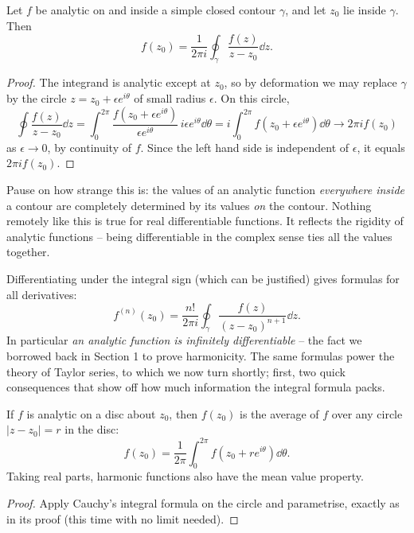 \documentclass[a4paper]{scrartcl}
\begin{document}
\begin{theorem}
	Let $f$ be analytic on and inside a simple closed contour $\gamma$, and let $z_0$ lie inside $\gamma$. Then
	$$
	f(z_0) = \frac{1}{2\pi i} \oint_\gamma \frac{f(z)}{z - z_0} \dd z.
	$$
\end{theorem}
\begin{proof}
	The integrand is analytic except at $z_0$, so by deformation we may replace $\gamma$ by the circle $z = z_0 + \epsilon e^{i\theta}$ of small radius $\epsilon$. On this circle,
	$$
	\oint \frac{f(z)}{z - z_0} \dd z = \int_0^{2\pi} \frac{f(z_0 + \epsilon e^{i\theta})}{\epsilon e^{i\theta}} \, i\epsilon e^{i\theta} \dd \theta = i \int_0^{2\pi} f(z_0 + \epsilon e^{i\theta}) \dd \theta \to 2\pi i f(z_0)
	$$
	as $\epsilon \to 0$, by continuity of $f$. Since the left hand side is independent of $\epsilon$, it equals $2\pi i f(z_0)$.
\end{proof}

Pause on how strange this is: the values of an analytic function \emph{everywhere inside} a contour are completely determined by its values \emph{on} the contour. Nothing remotely like this is true for real differentiable functions. It reflects the rigidity of analytic functions -- being differentiable in the complex sense ties all the values together.

Differentiating under the integral sign (which can be justified) gives formulas for all derivatives:
$$
f^{(n)}(z_0) = \frac{n!}{2\pi i} \oint_\gamma \frac{f(z)}{(z - z_0)^{n + 1}} \dd z.
$$
In particular \emph{an analytic function is infinitely differentiable} -- the fact we borrowed back in Section 1 to prove harmonicity. The same formulas power the theory of Taylor series, to which we now turn shortly; first, two quick consequences that show off how much information the integral formula packs.

\begin{proposition}
	If $f$ is analytic on a disc about $z_0$, then $f(z_0)$ is the average of $f$ over any circle $|z - z_0| = r$ in the disc:
	$$
	f(z_0) = \frac{1}{2\pi} \int_0^{2\pi} f(z_0 + re^{i\theta}) \dd \theta.
	$$
	Taking real parts, harmonic functions also have the mean value property.
\end{proposition}
\begin{proof}
	Apply Cauchy's integral formula on the circle and parametrise, exactly as in its proof (this time with no limit needed).
\end{proof}
\end{document}

